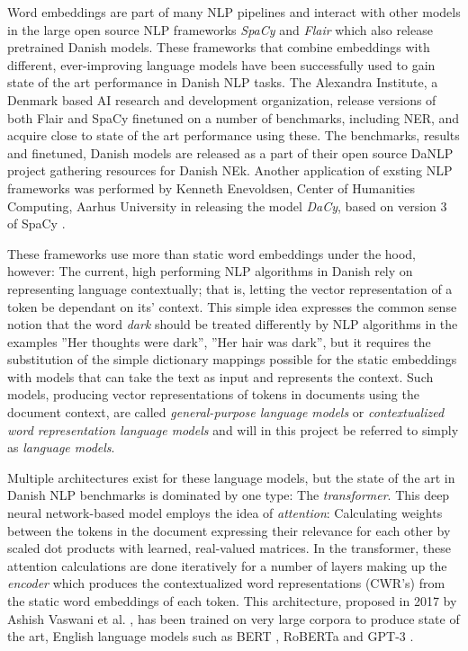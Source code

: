 \documentclass[main.tex]{subfiles}
\begin{document}
Word embeddings are part of many NLP pipelines and interact with other models in the large open source NLP frameworks \emph{SpaCy} \cite{honnibal2020spacy} and \emph{Flair} \cite{akbik2019flair} which also release pretrained Danish models.
These frameworks that combine embeddings with different, ever-improving language models have been successfully used to gain state of the art performance in Danish NLP tasks.
The Alexandra Institute, a Denmark based AI research and development organization, release versions of both Flair and SpaCy finetuned on a number of benchmarks, including NER, and acquire close to state of the art performance using these.
The benchmarks, results and finetuned, Danish models are released as a part of their open source DaNLP project gathering resources for Danish NEk\cite{danlp2021}.
Another application of exsting NLP frameworks was performed by Kenneth Enevoldsen, Center of Humanities Computing, Aarhus University in releasing the model \emph{DaCy}, based on version 3 of SpaCy \cite{enevoldsen2020dacy}.

These frameworks use more than static word embeddings under the hood, however:
The current, high performing NLP algorithms in Danish rely on representing language contextually; that is, letting the vector representation of a token be dependant on its' context.
This simple idea expresses the common sense notion that the word \emph{dark} should be treated differently by NLP algorithms in the examples ''Her thoughts were dark'', ''Her hair was dark'', but it requires the substitution of the simple dictionary mappings possible for the static embeddings with models that can take the text as input and represents the context.
Such models, producing vector representations of tokens in documents using the document context, are called \emph{general-purpose language models} \cite[Chap. 2]{birk2020knowledge} or \emph{contextualized word representation language models} \cite[Sec. 2]{yamada2020luke} and will in this project be referred to simply as \emph{language models}.

Multiple architectures exist for these language models, but the state of the art in Danish NLP benchmarks is dominated by one type: The \emph{transformer}.
This deep neural network-based model employs the idea of \emph{attention}:
Calculating weights between the tokens in the document expressing their relevance for each other by scaled dot products with learned, real-valued matrices.
In the transformer, these attention calculations are done iteratively for a number of layers making up the \emph{encoder} which produces the contextualized word representations (CWR's) from the static word embeddings of each token.
This architecture, proposed in 2017 by Ashish Vaswani et al. \cite{vaswani2017att}, has been trained on very large corpora to produce state of the art, English language models such as BERT \cite{devlin2019bert}, RoBERTa \cite{liu2019roberta} and GPT-3 \cite{brown2020language}.
\end{document}
